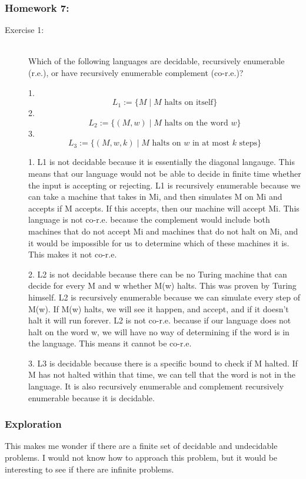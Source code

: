 \documentclass{article}
\theoremstyle{theorem}
\theoremstyle{definition}
\theoremstyle{remark}
\begin{document}
\subsubsection{Homework 7:}
\begin{description}
\item[Exercise 1:] \textbf{ }\\
Which of the following languages are decidable, recursively enumerable (r.e.), or have recursively enumerable complement (co-r.e.)?

1. $$L_1 := \{M \; | \; \text{$M$ halts on itself} \}$$
2. $$L_2 := \{(M,w) \; | \; \text{$M$ halts on the word $w$} \}$$
3. $$L_3 := \{(M,w,k) \; | \; \text{$M$ halts on $w$ in at most $k$ steps} \}$$

1. L1 is not decidable because it is essentially the diagonal langauge. This means that our language would not be able to decide in finite time whether the input is accepting or rejecting. L1 is recursively enumerable because we can take a machine that takes in Mi, and then simulates M on Mi and accepts if M accepts. If this accepts, then our machine will accept Mi. This language is not co-r.e. because the complement would include both machines that do not accept Mi and machines that do not halt on Mi, and it would be impossible for us to determine which of these machines it is. This makes it not co-r.e.

2. L2 is not decidable because there can be no Turing machine that can decide for every M and w whether M(w) halts. This was proven by Turing himself. L2 is recursively enumerable because we can simulate every step of M(w). If M(w) halts, we will see it happen, and accept, and if it doesn't halt it will run forever. L2 is not co-r.e. because if our language does not halt on the word w, we will have no way of determining if the word is in the language. This means it cannot be co-r.e.

3. L3 is decidable because there is a specific bound to check if M halted. If M has not halted within that time, we can tell that the word is not in the language. It is also recursively enumerable and complement recursively enumerable because it is decidable.

\end{description}

\subsubsection{Exploration}
This makes me wonder if there are a finite set of decidable and undecidable problems. I would not know how to approach this problem, but it would be interesting to see if there are infinite problems.
\end{document}
